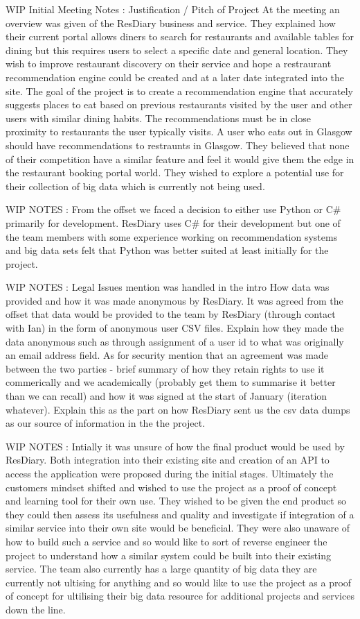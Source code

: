 \documentclass{l3proj}
\begin{document}
WIP Initial Meeting Notes : Justification / Pitch of Project
At the meeting an overview was given of the ResDiary business and service. 
They explained how their current portal allows diners to search for restaurants and available tables for dining but this requires users to select a specific date and general location. 
They wish to improve restaurant discovery on their service and hope a restraurant recommendation engine could be created and at a later date integrated into the site.
The goal of the project is to create a recommendation engine that accurately suggests places to eat based on previous restaurants visited by the user and other users with similar dining habits.
The recommendations must be in close proximity to restaurants the user typically visits. A user who eats out in Glasgow should have recommendations to restraunts in Glasgow.
They believed that none of their competition have a similar feature and feel it would give them the edge in the restaurant booking portal world.
They wished to explore a potential use for their collection of big data which is currently not being used. 

WIP NOTES : 
From the offset we faced a decision to either use Python or C\# primarily for development. ResDiary uses C\# for their development but one of the team members with some experience working on recommendation systems and big data sets felt that Python was better suited at least initially for the project. 

WIP NOTES : 
Legal Issues mention was handled in the intro
How data was provided and how it was made anonymous by ResDiary.
It was agreed from the offset that data would be provided to the team by ResDiary (through contact with Ian) in the form of anonymous user CSV files. Explain how they made the data anonymous such as through assignment of a user id to what was originally an email address field.
As for security mention that an agreement was made between the two parties - brief summary of how they retain rights to use it commerically and we academically (probably get them to summarise it better than we can recall) and how it was signed at the start of January (iteration whatever).
Explain this as the part on how ResDiary sent us the csv data dumps as our source of information in the the project.

WIP NOTES :
Intially it was unsure of how the final product would be used by ResDiary. 
Both integration into their existing site and creation of an API to access the application were proposed during the initial stages. 
Ultimately the customers mindset shifted and wished to use the project as a proof of concept and learning tool for their own use.
They wished to be given the end product so they could then assess its usefulness and quality and investigate if integration of a similar service into their own site would be beneficial.
They were also unaware of how to build such a service and so would like to sort of reverse engineer the project to understand how a similar system could be built into their existing service.
The team also currently has a large quantity of big data they are currently not ultising for anything and so would like to use the project as a proof of concept for ultilising their big data resource for additional projects and services down the line.
\end{document}
